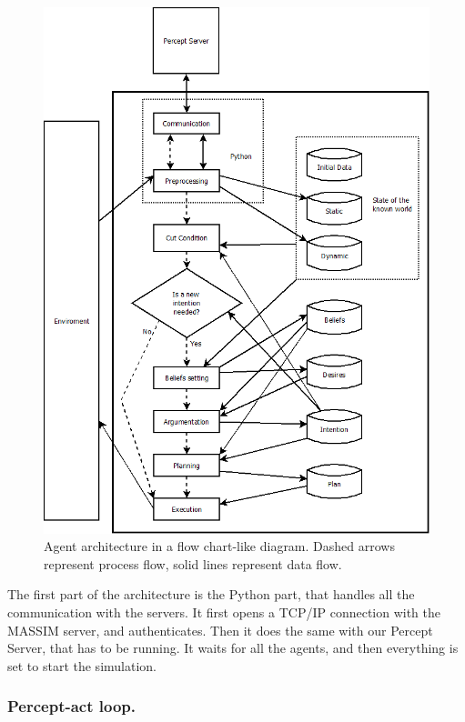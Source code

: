 \documentclass{llncs2e/llncs}
\begin{document}
\begin{figure}
\centering
  \includegraphics[width=\textwidth]{agent_architecture2.png}
    \caption{Agent architecture in a flow chart-like diagram. 
    Dashed arrows represent process flow, solid lines represent data flow.}
\label{fig:architecture}
\end{figure}


    The first part of the architecture is the Python part, that handles all the 
    communication with the servers. It first opens a TCP/IP connection with the 
    MASSIM server, and authenticates. Then it does the same with our Percept 
    Server, that has to be running. It waits for all the agents, and then 
    everything is set to start the simulation.

\subsubsection{Percept-act loop.}
\end{document}
